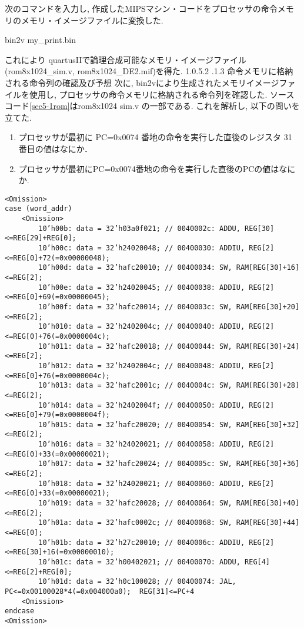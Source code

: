 \documentclass[epsf,a4paper,dvipdfmx,autodetect-engine,titlepage]{jsarticle}
\makeatletter
\newcommand{\subsubsubsection}
{\@startsection{paragraph}{4}{\z@}%
{1.0\Cvs \@plus.5\Cdp \@minus.2\Cdp}%
{.1\Cvs \@plus.3\Cdp}%
{\reset@font\sffamily\normalsize}}
\makeatother
\begin{document}
次のコマンドを入力し, 作成したMIPSマシン・コードをプロセッサの命令メモリのメモリ・イメージファイルに変換した.
\begin{screen}
bin2v my\_print.bin
\end{screen}
これにより quartusIIで論理合成可能なメモリ・イメージファイル(rom8x1024\_sim.v, rom8x1024\_DE2.mif)を得た. 
\subsubsubsection{命令メモリに格納される命令列の確認及び予想}
次に, bin2vにより生成されたメモリイメージファイルを使用し, プロセッサの命令メモリに格納される命令列を確認した. ソースコード\ref{sec5-1rom}はrom8x1024 sim.v の一部である. これを解析し, 以下の問いを立てた. 
\begin{enumerate}
    \item プロセッサが最初に PC=0x0074 番地の命令を実行した直後のレジスタ 31 番目の値はなにか．
    
    \item プロセッサが最初にPC=0x0074番地の命令を実行した直後のPCの値はなにか.
\end{enumerate}
\begin{lstlisting}[caption=実験5-1で生成されたrom8x1024\_sim.v,label=sec5-1rom]
<Omission>
case (word_addr)
    <Omission>
        10’h00b: data = 32’h03a0f021; // 0040002c: ADDU, REG[30]<=REG[29]+REG[0]; 
        10’h00c: data = 32’h24020048; // 00400030: ADDIU, REG[2]<=REG[0]+72(=0x00000048);
        10’h00d: data = 32’hafc20010; // 00400034: SW, RAM[REG[30]+16]<=REG[2];
        10’h00e: data = 32’h24020045; // 00400038: ADDIU, REG[2]<=REG[0]+69(=0x00000045);
        10’h00f: data = 32’hafc20014; // 0040003c: SW, RAM[REG[30]+20]<=REG[2];
        10’h010: data = 32’h2402004c; // 00400040: ADDIU, REG[2]<=REG[0]+76(=0x0000004c);
        10’h011: data = 32’hafc20018; // 00400044: SW, RAM[REG[30]+24]<=REG[2];
        10’h012: data = 32’h2402004c; // 00400048: ADDIU, REG[2]<=REG[0]+76(=0x0000004c);
        10’h013: data = 32’hafc2001c; // 0040004c: SW, RAM[REG[30]+28]<=REG[2];
        10’h014: data = 32’h2402004f; // 00400050: ADDIU, REG[2]<=REG[0]+79(=0x0000004f);
        10’h015: data = 32’hafc20020; // 00400054: SW, RAM[REG[30]+32]<=REG[2];
        10’h016: data = 32’h24020021; // 00400058: ADDIU, REG[2]<=REG[0]+33(=0x00000021);
        10’h017: data = 32’hafc20024; // 0040005c: SW, RAM[REG[30]+36]<=REG[2];
        10’h018: data = 32’h24020021; // 00400060: ADDIU, REG[2]<=REG[0]+33(=0x00000021);
        10’h019: data = 32’hafc20028; // 00400064: SW, RAM[REG[30]+40]<=REG[2];
        10’h01a: data = 32’hafc0002c; // 00400068: SW, RAM[REG[30]+44]<=REG[0];
        10’h01b: data = 32’h27c20010; // 0040006c: ADDIU, REG[2]<=REG[30]+16(=0x00000010);
        10’h01c: data = 32’h00402021; // 00400070: ADDU, REG[4]<=REG[2]+REG[0];
        10’h01d: data = 32’h0c100028; // 00400074: JAL, PC<=0x00100028*4(=0x004000a0);  REG[31]<=PC+4 
    <Omission>
endcase
<Omission>
\end{lstlisting}
\end{document}
